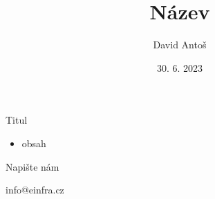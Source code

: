\documentclass[aspectratio=169]{beamer}
\begin{document}
\title{Název}
\author[D.A.]{David Antoš}
\date{30. 6. 2023}


\begin{frame}[plain]
  \maketitle
\end{frame}


\begin{frame}{Titul}
  \begin{itemize}
    \item obsah
  \end{itemize}
\end{frame}

\begin{frame}{}
  \vspace*{.35\textheight}\par %
  Napište nám
  \par
  info@einfra.cz

\end{frame}
\end{document}
